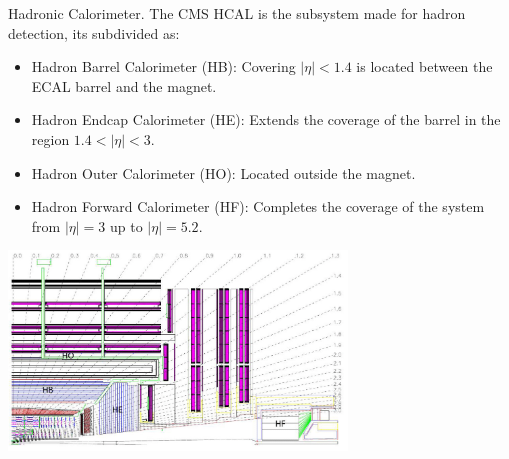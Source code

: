 \documentclass[8pt]{beamer}
\begin{document}

\begin{frame}[fragile]{Hadronic Calorimeter.}
	The CMS HCAL is the subsystem made for hadron detection, its subdivided as:
	\begin{itemize}
		\item Hadron Barrel Calorimeter (HB): Covering $|\eta| < 1.4$ is located between the	ECAL barrel and the magnet.
		\item Hadron Endcap Calorimeter (HE): Extends the coverage of the barrel in the
		region $1.4 <|\eta| < 3$.
		\item Hadron Outer Calorimeter (HO): Located outside the magnet.
		\item Hadron Forward Calorimeter (HF): Completes the coverage of the system
		from $|\eta| = 3$ up to $|\eta| = 5.2$.
	\end{itemize}
	
	
	\includegraphics[width=9cm]{15}
\end{frame}

\end{document}
